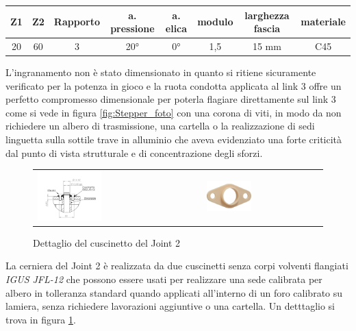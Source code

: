 \documentclass[%
corpo=11pt,
twoside,
 stile=classica,
oldstyle,
greek,%
]{toptesi}
\begin{document}
			\begin{tabular}{|c|c|c|c|c|c|c|c|}
			
			\hline
			Z1 & Z2 & Rapporto & a. pressione & a. elica & modulo & larghezza fascia & materiale \\
			\hline
			20 & 60 & 3 & 20° & 0°  & 1,5 & 15 mm & C45  \\
			\hline
			
		\end{tabular}
		
		L'ingranamento non è stato dimensionato in quanto si ritiene sicuramente verificato per la potenza in gioco e la ruota condotta applicata al link 3 offre un perfetto compromesso dimensionale per poterla flagiare direttamente sul link 3 come si vede in figura \ref{fig:Stepper_foto} con una corona di viti, in modo da non richiedere un albero di trasmissione, una cartella o la realizzazione di sedi linguetta sulla sottile trave in alluminio che aveva evidenziato una forte criticità dal punto di vista strutturale e di concentrazione degli sforzi. \\
		
		\begin{figure} [!ht]
		\centering
			\begin{tabular}{ll}
				\includegraphics[width=0.4\textwidth]{Screen/cuscinetto.png}
				&
				\includegraphics[width=0.4\textwidth]{image/jfl12.jpg}
			\end{tabular}				
		\caption{Dettaglio del cuscinetto del Joint 2}
		\label{fig:cuscinetto_foto}
		\end{figure}		
		
		La cerniera del Joint 2 è realizzata da due cuscinetti senza corpi volventi flangiati \textit{IGUS JFL-12} che possono essere usati per realizzare una sede calibrata per albero in tolleranza standard quando applicati all'interno di un foro calibrato su lamiera, senza richiedere lavorazioni aggiuntive o una cartella. Un detttaglio si trova in figura \ref{fig:cuscinetto_foto}.
	
\end{document}

